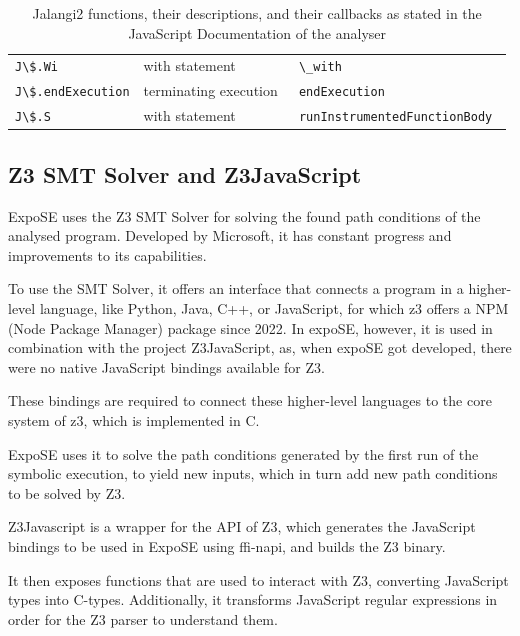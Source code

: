 \begin{table}[h]
{\begin{tabular}{l|l|l}
		{\lstinline|J\$.Wi          |} & with statement                                        &\lstinline| \_with                      |            \\
		{\lstinline|J\$.endExecution|} & terminating execution                                 &\lstinline| endExecution                |            \\
		{\lstinline|J\$.S           |} & with statement                                        &\lstinline| runInstrumentedFunctionBody |            \\
	\end{tabular}}
	\caption[List of Jalangi2 functions]{Jalangi2  functions, their descriptions, and their callbacks as stated in the JavaScript Documentation of the analyser}
	\label{tab:jal-fun}
\end{table}

\FloatBarrier
\subsection{Z3 SMT Solver and Z3JavaScript}
\label{sec:z3}


ExpoSE uses the Z3 SMT Solver \cite{de_moura_z3_2008} for solving the found path conditions of the analysed program. Developed by Microsoft, it has constant progress and improvements to its capabilities.

To use the SMT Solver, it offers an interface that connects a program in a higher-level language, like Python, Java, C++, or JavaScript, for which z3 offers a NPM (Node Package Manager) package since 2022. In expoSE, however, it is used in combination with the project Z3JavaScript, as, when expoSE got developed, there were no native JavaScript bindings available for Z3. 

These bindings are required to connect these higher-level languages to the core system of z3, which is implemented in C.

ExpoSE uses it to solve the path conditions generated by the first run of the symbolic execution, to yield new inputs, which in turn add new path conditions to be solved by Z3. 


Z3Javascript is a wrapper for the API of Z3, which generates the JavaScript bindings to be used in ExpoSE using ffi-napi, and builds the Z3 binary.

It then exposes functions that are used to interact with Z3, converting JavaScript types into C-types. 
Additionally, it transforms JavaScript regular expressions in order for the Z3 parser to understand them.






